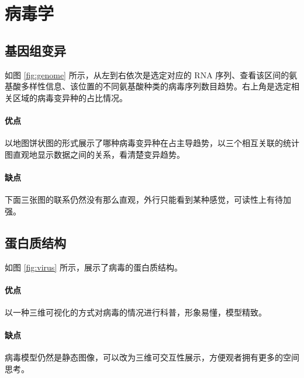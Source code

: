     \section{病毒学}
    \subsection{基因组变异}
    如图 \ref{fig:genome} 所示，从左到右依次是选定对应的 RNA 序列、查看该区间的氨基酸多样性信息、该位置的不同氨基酸种类的病毒序列数目趋势。右上角是选定相关区域的病毒变异种的占比情况。


    \paragraph{优点} 以地图饼状图的形式展示了哪种病毒变异种在占主导趋势，以三个相互关联的统计图直观地显示数据之间的关系，看清楚变异趋势。

    \paragraph{缺点} 下面三张图的联系仍然没有那么直观，外行只能看到某种感觉，可读性上有待加强。

    \subsection{蛋白质结构}
    如图 \ref{fig:virus} 所示，展示了病毒的蛋白质结构。

    \paragraph{优点} 以一种三维可视化的方式对病毒的情况进行科普，形象易懂，模型精致。

    \paragraph{缺点} 病毒模型仍然是静态图像，可以改为三维可交互性展示，方便观者拥有更多的空间思考。

